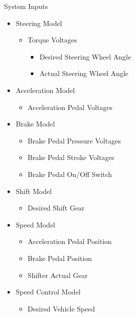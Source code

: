 \documentclass{beamer}
\begin{document}
\begin{frame}
\begin{minipage}[t]{0.48\linewidth}
\tiny
	\begin{block}{System Inputs}
		\begin{itemize}
			\tiny
		    \item Steering Model
		    \begin{itemize}
		    \tiny
		    		\item Torque Voltages
		    		\begin{itemize}
		    		\tiny
		    			\item Desired Steering Wheel Angle
		    			\item Actual Steering Wheel Angle
		    		\end{itemize}
		    \end{itemize}
		    \item Acceleration Model
		    \begin{itemize}
		    \tiny
		    		\item Acceleration Pedal Voltages
		    \end{itemize}
		    \item Brake Model
		    \begin{itemize}
		    \tiny
		    		\item Brake Pedal Pressure Voltages
		    		\item Brake Pedal Stroke Voltages 
		    		\item Brake Pedal On/Off Switch
		    \end{itemize}
		    \item Shift Model
		    \begin{itemize}
		    \tiny
		    		\item Desired Shift Gear
		    \end{itemize}
		    \item Speed Model
		    \begin{itemize}
		    \tiny
		    		\item Acceleration Pedal Position
		    		\item Brake Pedal Position
		    		\item Shifter Actual Gear
		    \end{itemize}
		    \item Speed Control Model
		    \begin{itemize}
		    \tiny
		    		\item Desired Vehicle Speed
		    \end{itemize}
		\end{itemize}

\end{block}
\end{minipage}
\end{frame}
\end{document}
